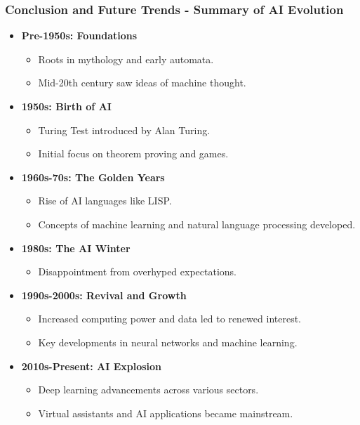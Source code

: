 \documentclass[aspectratio=169]{beamer}
\begin{document}
\begin{frame}[fragile]
    \frametitle{Conclusion and Future Trends - Summary of AI Evolution}
    \begin{itemize}
        \item \textbf{Pre-1950s: Foundations}
        \begin{itemize}
            \item Roots in mythology and early automata.
            \item Mid-20th century saw ideas of machine thought.
        \end{itemize}
        
        \item \textbf{1950s: Birth of AI}
        \begin{itemize}
            \item Turing Test introduced by Alan Turing.
            \item Initial focus on theorem proving and games.
        \end{itemize}
        
        \item \textbf{1960s-70s: The Golden Years}
        \begin{itemize}
            \item Rise of AI languages like LISP.
            \item Concepts of machine learning and natural language processing developed.
        \end{itemize}
        
        \item \textbf{1980s: The AI Winter}
        \begin{itemize}
            \item Disappointment from overhyped expectations.
        \end{itemize}
        
        \item \textbf{1990s-2000s: Revival and Growth}
        \begin{itemize}
            \item Increased computing power and data led to renewed interest.
            \item Key developments in neural networks and machine learning.
        \end{itemize}
        
        \item \textbf{2010s-Present: AI Explosion}
        \begin{itemize}
            \item Deep learning advancements across various sectors.
            \item Virtual assistants and AI applications became mainstream.
        \end{itemize}
    \end{itemize}
\end{frame}
\end{document}
